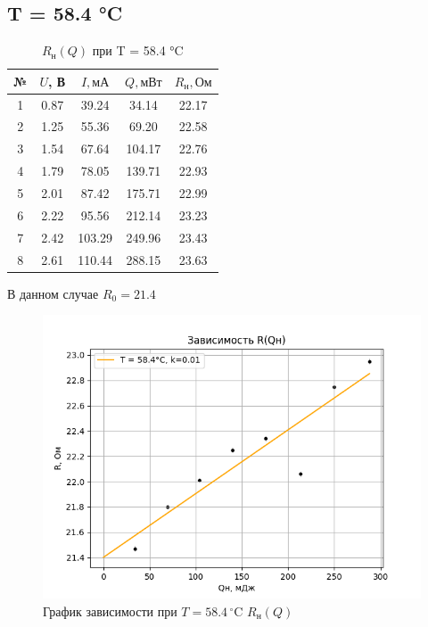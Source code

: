 \documentclass[a4paper, 10pt, twocolumn]{article}
\begin{document}
    \subsection{T = 58.4 °C}
    \begin{table}[H]
        \centering
        \begin{tabular}{|c|c|c|c|c|} \hline
        № & $U$, В & $I, \text{мА}$ & $ Q, \text{мВт} $ & $R_\text{н}, \text{Ом}$ \\ \hline
        1 & 0.87 & 39.24  & 34.14  & 22.17 \\ \hline
        2 & 1.25 & 55.36  & 69.20  & 22.58 \\ \hline
        3 & 1.54 & 67.64  & 104.17 & 22.76 \\ \hline
        4 & 1.79 & 78.05  & 139.71 & 22.93 \\ \hline
        5 & 2.01 & 87.42  & 175.71 & 22.99 \\ \hline
        6 & 2.22 & 95.56  & 212.14 & 23.23 \\ \hline
        7 & 2.42 & 103.29 & 249.96 & 23.43 \\ \hline
        8 & 2.61 & 110.44 & 288.15 & 23.63 \\ \hline
        \end{tabular}
        \caption{$R_\text{н}(Q)$ при T = 58.4 °C}
    \end{table}

    В данном случае $R_0 = 21.4$

    \begin{figure}[H]
        \centering
        \includegraphics[width=1\linewidth]{graphs/figure4.png}
        \begin{center}
            \caption{График зависимости при $T =58.4 \, ^\circ\text{C}$ $R_\text{н}(Q)$}
        \end{center}
    \end{figure}
\end{document}
